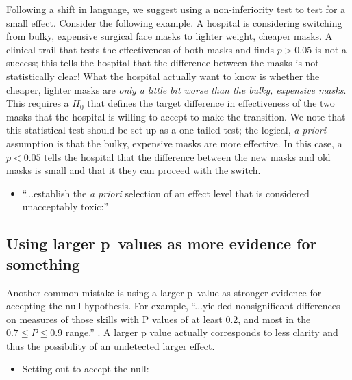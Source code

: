 Following a shift in language, we suggest using a non-inferiority test to test for a small effect. Consider the following 
example. A hospital is considering switching from bulky, expensive surgical face masks to lighter weight, cheaper masks. A
clinical trail that tests the effectiveness of both masks and finds $p > 0.05$ is not a success; this tells the hospital 
that the difference between the masks is not statistically clear! What the hospital actually want to know is whether the 
cheaper, lighter masks are \emph{only a little bit worse than the bulky, expensive masks}. This requires a $H_{0}$ that 
defines the target difference in effectiveness of the two masks that the hospital is willing to accept to make the 
transition. We note that this statistical test should be set up as a one-tailed test; the logical, \emph{a priori} 
assumption is that the bulky, expensive masks are more effective. In this case, a $p < 0.05$ tells the hospital that the 
difference between the new masks and old masks is small and that it they can proceed with the switch.

\begin{itemize}
  \item ``...establish the \emph{a priori} selection of an effect level that is considered unacceptably toxic:''
  \citep{Dentonetal.2011}
\end{itemize}

\subsection*{Using larger p~values as more evidence for something}

Another common mistake is using a larger p~value as stronger evidence for accepting the null hypothesis.  For example, 
 ``...yielded nonsignificant differences on measures of those skills with P 
values of at least 0.2, and most in the $0.7 \leq P \leq 0.9$ range.'' \citep{Feldonetal.2017}. A larger p value actually
corresponds to less clarity and thus the possibility of an undetected larger effect. 


\begin{itemize}
  \item Setting out to accept the null: \citep{Karulinetal.2015}
\end{itemize}  


